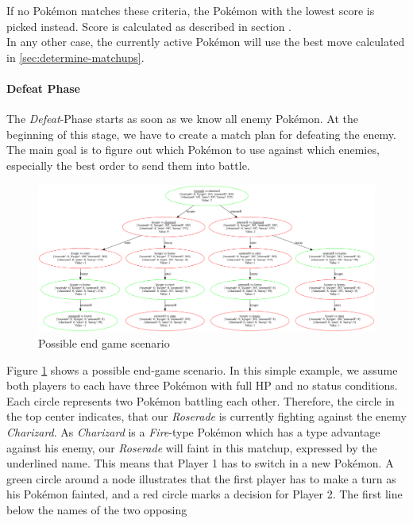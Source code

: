 If no Pokémon matches these criteria, the Pokémon with the lowest score is picked instead.
Score is calculated as described in section . \\
In any other case, the currently active Pokémon will use the best move calculated in \ref{sec:determine-matchups}.

\paragraph{Defeat Phase}
\label{sec:defeat-phase}
The \textit{Defeat}-Phase starts as soon as we know all enemy Pokémon. At the beginning of this stage, we have to create
a match plan for defeating the enemy. The main goal is to figure out which Pokémon to use against which enemies, especially
the best order to send them into battle. 
\begin{figure}[h]
	\centering
	\includegraphics[width=1\textwidth]{images/MinMaxTree.png}
	\caption{Possible end game scenario}
	\label{fig:game-plan}
\end{figure}
Figure \ref{fig:game-plan} shows a possible end-game scenario. In this simple example, we assume both players to each
have three Pokémon with full \ac{HP} and no status conditions. Each circle represents two Pokémon battling each other.
Therefore, the circle in the top center indicates, that our \textit{Roserade} is currently fighting against the enemy
\textit{Charizard}. As \textit{Charizard} is a \textit{Fire}-type Pokémon which has a type advantage against his enemy,
our \textit{Roserade} will faint in this matchup, expressed by the underlined name. This means that Player 1 has to
switch in a new Pokémon. A green circle around a node illustrates that the first player has to make a turn as his 
Pokémon fainted, and a red circle marks a decision for Player 2. The first line below the names of the two opposing
